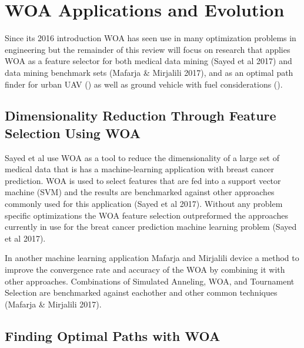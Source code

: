 \documentclass[11pt]{article}
\begin{document}
\section*{WOA Applications and Evolution}
Since its 2016 introduction WOA has seen use in many optimization problems in engineering but the remainder of this review will focus on research that applies WOA as a feature selector for both medical data mining (Sayed et al 2017) and data mining benchmark sets (Mafarja \& Mirjalili 2017), and as an optimal path finder for urban UAV () as well as ground vehicle with fuel considerations ().

\subsection*{Dimensionality Reduction Through Feature Selection Using WOA}
Sayed et al use WOA as a tool to reduce the dimensionality of a large set of medical data that is has a machine-learning application with breast cancer prediction.
WOA is used to select features that are fed into a support vector machine (SVM) and the results are benchmarked against other approaches commonly used for this application (Sayed et al 2017).
Without any problem specific optimizations the WOA feature selection outpreformed the approaches currently in use for the breat cancer prediction machine learning problem (Sayed et al 2017).

In another machine learning application Mafarja and Mirjalili device a method to improve the convergence rate and accuracy of the WOA by combining it with other approaches.
Combinations of Simulated Anneling, WOA, and Tournament Selection are benchmarked against eachother and other common techniques (Mafarja \& Mirjalili 2017).


\subsection*{Finding Optimal Paths with WOA}
\end{document}
